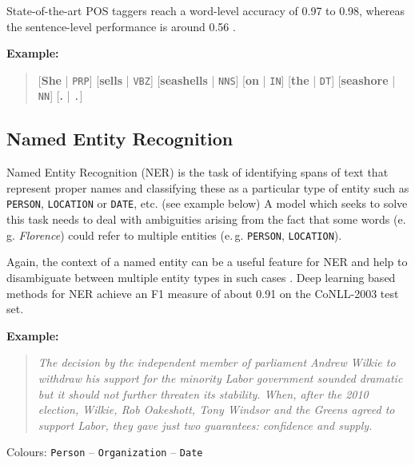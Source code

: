 \documentclass[twocolumns]{IEEEtran}
\begin{document}
State-of-the-art POS taggers reach a word-level accuracy of 0.97 to 0.98, whereas the sentence-level performance is around 0.56 \cite{postaggingbenchmark} \cite{manningpostagging} \cite{dlnerbenchmark}.

\vspace*{3mm}
\textbf{Example:}

\begin{quote}
    [\textbf{She} | \texttt{PRP}] [\textbf{sells} | \texttt{VBZ}] [\textbf{seashells} | \texttt{NNS}] [\textbf{on} | \texttt{IN}] [\textbf{the} | \texttt{DT}] [\textbf{seashore} | \texttt{NN}] [\textbf{.} | \texttt{.}]
\end{quote}

\subsection{Named Entity Recognition}
Named Entity Recognition (NER) is the task of identifying spans of text that represent proper names and classifying these as a particular type of entity such as \texttt{PERSON}, \texttt{LOCATION} or \texttt{DATE}, etc. (see example below)
A model which seeks to solve this task needs to deal with ambiguities arising from the fact that some words (e.\,g. \textit{Florence}) could refer to multiple entities (e.\,g. \texttt{PERSON}, \texttt{LOCATION}).

Again, the context of a named entity can be a useful feature for NER and help to disambiguate between multiple entity types in such cases \cite[cf. pages 761-765]{Jurafsky}. Deep learning based methods for NER achieve an F1 measure of about 0.91 on the CoNLL-2003 test set\cite{dlnerbenchmark}.

\vspace*{3mm}
\textbf{Example:}

\begin{quote}
\textit{The decision by the independent member of parliament \colorbox{blue!30}{Andrew Wilkie} to withdraw his support for the minority \colorbox{red!30}{Labor} government sounded dramatic but it should not further threaten its stability. When, after the \colorbox{yellow!30}{2010} election, \colorbox{blue!30}{Wilkie}, \colorbox{blue!30}{Rob Oakeshott}, \colorbox{blue!30}{Tony Windsor} and the \colorbox{red!30}{Greens} agreed to support \colorbox{red!30}{Labor}, they gave just two guarantees: confidence and supply.}
\end{quote}

\vspace*{2mm}
Colours: \colorbox{blue!30}{\texttt{Person}} -- \colorbox{red!30}{\texttt{Organization}} -- \colorbox{yellow!30}{\texttt{Date}}
\end{document}
